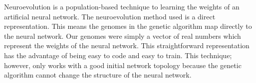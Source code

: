 Neuroevolution is a population-based technique to learning the weights of an artificial neural network.  The neuroevolution method used is a direct representation. This means the genomes in the genetic algorithm map directly to the neural network. Our genomes were simply a vector of real numbers which represent the weights of the neural network. This straightforward representation has the advantage of being easy to code and easy to train. This technique; however, only works with a good initial network topology because the genetic algorithm cannot change the structure of the neural network.

